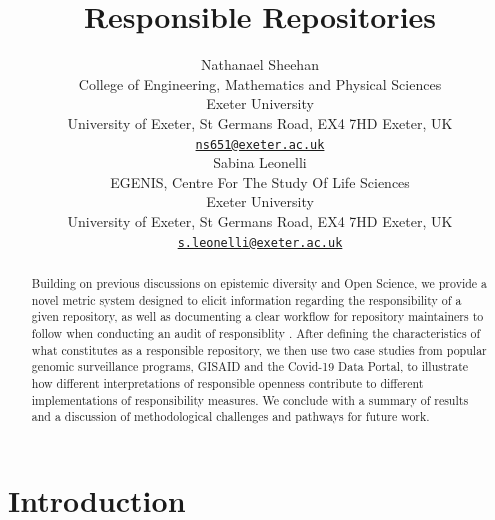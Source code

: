 \documentclass{article}
\title{Responsible Repositories}
\author{
    Nathanael Sheehan
   \\
    College of Engineering, Mathematics and Physical Sciences \\
    Exeter University \\
  University of Exeter, St Germans Road, EX4 7HD Exeter, UK \\
  \texttt{\href{mailto:ns651@exeter.ac.uk}{\nolinkurl{ns651@exeter.ac.uk}}} \\
   \And
    Sabina Leonelli
   \\
    EGENIS, Centre For The Study Of Life Sciences \\
    Exeter University \\
  University of Exeter, St Germans Road, EX4 7HD Exeter, UK \\
  \texttt{\href{mailto:s.leonelli@exeter.ac.uk}{\nolinkurl{s.leonelli@exeter.ac.uk}}} \\
  }
\begin{document}
\maketitle


\begin{abstract}
Building on previous discussions on epistemic diversity and Open
Science, we provide a novel metric system designed to elicit information
regarding the responsibility of a given repository, as well as
documenting a clear workflow for repository maintainers to follow when
conducting an audit of responsiblity . After defining the
characteristics of what constitutes as a responsible repository, we then
use two case studies from popular genomic surveillance programs, GISAID
and the Covid-19 Data Portal, to illustrate how different
interpretations of responsible openness contribute to different
implementations of responsibility measures. We conclude with a summary
of results and a discussion of methodological challenges and pathways
for future work.
\end{abstract}


\newpage

\hypertarget{introduction}{%
\section{Introduction}\label{introduction}}
\end{document}
